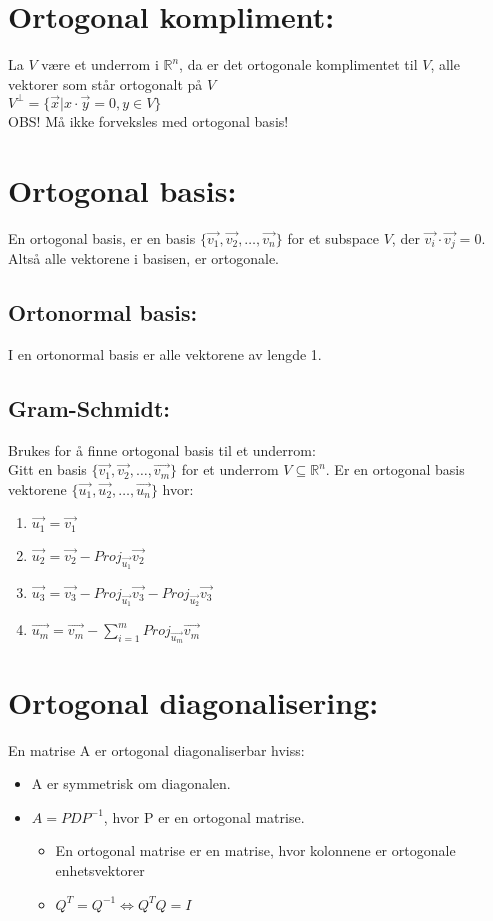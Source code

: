 \documentclass[12pt,a4paper,twocolumn,twoside]{article}
\def\real{\mathbb{R}}
\begin{document}
\section*{Ortogonal kompliment:}
La $V$ være et underrom i $\real^n$, da er det ortogonale komplimentet til $V$, alle vektorer som står ortogonalt på $V$\\
$V^\perp=\{\vec{x}|x\cdot\vec{y} = 0, y\in V\}$\\
OBS! Må ikke forveksles med ortogonal basis!

\section*{Ortogonal basis:}
En ortogonal basis, er en basis $\{\vec{v_1},\vec{v_2},\dots,\vec{v_n}\}$ for et subspace $V$, der $\vec{v_i}\cdot\vec{v_j}=0$.
Altså alle vektorene i basisen, er ortogonale. 

\subsection*{Ortonormal basis:}
I en ortonormal basis er alle vektorene av lengde 1.

\subsection*{Gram-Schmidt:}
Brukes for å finne ortogonal basis til et underrom:\\
Gitt en basis $\{\vec{v_1},\vec{v_2},\dots,\vec{v_m}\}$ for et underrom $V \subseteq \real^n$. Er en ortogonal basis vektorene $\{\vec{u_1},\vec{u_2},\dots,\vec{u_n}\}$ hvor:
\begin{enumerate}[topsep=0pt,itemsep=0pt, partopsep=0pt]
    \item $\vec{u_1}=\vec{v_1}$
    \item $\vec{u_2}=\vec{v_2}- Proj_{\vec{u_1}}\vec{v_2}$
    \item $\vec{u_3}=\vec{v_3}- Proj_{\vec{u_1}}\vec{v_3}-Proj_{\vec{u_2}}\vec{v_3}$
    \item $\vec{u_m}=\vec{v_m}- \sum_{i=1}^m Proj_{\vec{u_m}}\vec{v_m}$
\end{enumerate}

\section*{Ortogonal diagonalisering:}
En matrise A er ortogonal diagonaliserbar hviss:
\begin{itemize}[topsep=0pt,itemsep=0pt, partopsep=0pt]
    \item A er symmetrisk om diagonalen.
    \item $A=PDP^{-1}$, hvor P er en ortogonal matrise.
    \begin{itemize}
        \item En ortogonal matrise er en matrise, hvor kolonnene er ortogonale enhetsvektorer
        \item $Q^T=Q^{-1}\Leftrightarrow Q^TQ=I$
    \end{itemize}
\end{itemize}
\end{document}
